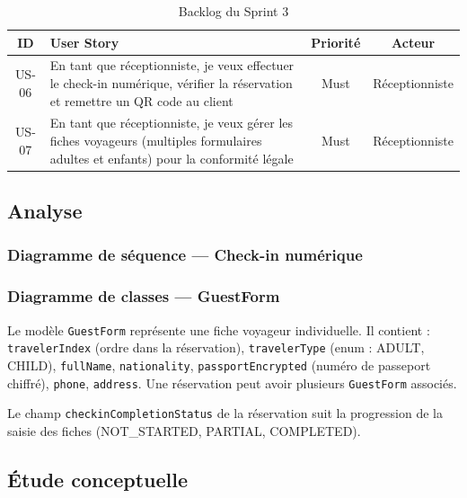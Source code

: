 \begin{table}[H]
\centering
\caption{Backlog du Sprint 3}
\label{tab:backlog_sprint3}
\begin{tabular}{|c|p{9cm}|c|c|}
\hline
\textbf{ID} & \textbf{User Story} & \textbf{Priorité} & \textbf{Acteur} \\
\hline
US-06 & En tant que réceptionniste, je veux effectuer le check-in numérique, vérifier la réservation et remettre un QR code au client & Must & Réceptionniste \\
\hline
US-07 & En tant que réceptionniste, je veux gérer les fiches voyageurs (multiples formulaires adultes et enfants) pour la conformité légale & Must & Réceptionniste \\
\hline
\end{tabular}
\end{table}

\subsection{Analyse}

\subsubsection{Diagramme de séquence — Check-in numérique}


\subsubsection{Diagramme de classes — GuestForm}


Le modèle \texttt{GuestForm} représente une fiche voyageur individuelle. Il contient : \texttt{travelerIndex} (ordre dans la réservation), \texttt{travelerType} (enum : ADULT, CHILD), \texttt{fullName}, \texttt{nationality}, \texttt{passportEncrypted} (numéro de passeport chiffré), \texttt{phone}, \texttt{address}. Une réservation peut avoir plusieurs \texttt{GuestForm} associés.

Le champ \texttt{checkinCompletionStatus} de la réservation suit la progression de la saisie des fiches (NOT\_STARTED, PARTIAL, COMPLETED).

\subsection{Étude conceptuelle}

